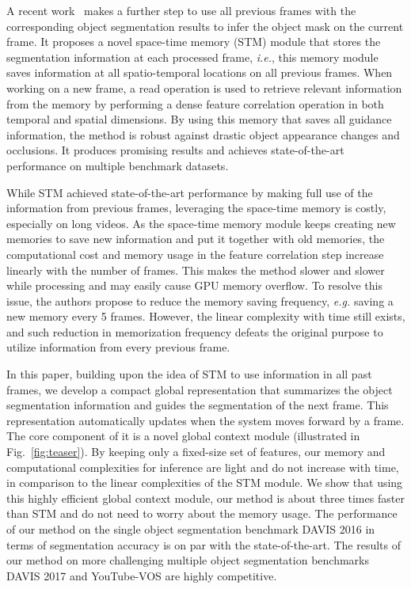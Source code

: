 \documentclass[runningheads]{llncs}
\begin{document}
A recent work~\cite{stm} makes a further step to use all previous frames with the corresponding object segmentation results to infer the object mask on the current frame. It proposes a novel space-time memory (STM) module that stores the segmentation information at each processed frame, \textit{i.e.}, this memory module saves information at all spatio-temporal locations on all previous frames. When working on a new frame, a read operation is used to retrieve relevant information from the memory by performing a dense feature correlation operation in both temporal and spatial dimensions. By using this memory that saves all guidance information, the method is robust against drastic object appearance changes and occlusions. It produces promising results and achieves state-of-the-art performance on multiple benchmark datasets.

While STM achieved state-of-the-art performance by making full use of the information from previous frames, leveraging the space-time memory is costly, especially on long videos. As the space-time memory module keeps creating new memories to save new information and put it together with old memories, the computational cost and memory usage in the feature correlation step increase linearly with the number of frames. This makes the method slower and slower while processing and may easily cause GPU memory overflow. To resolve this issue, the authors propose to reduce the memory saving frequency, \textit{e.g.} saving a new memory every 5 frames. However, the linear complexity with time still exists, and such reduction in memorization frequency defeats the original purpose to utilize information from every previous frame.

In this paper, building upon the idea of STM to use information in all past frames, we develop a compact global representation that summarizes the object segmentation information and guides the segmentation of the next frame. This representation automatically updates when the system moves forward by a frame. The core component of it is a novel global context module (illustrated in Fig.~\ref{fig:teaser}). By keeping only a fixed-size set of features, our memory and computational complexities for inference are light and do not increase with time, in comparison to the linear complexities of the STM module. We show that using this highly efficient global context module, our method is about three times faster than STM and do not need to worry about the memory usage. The performance of our method on the single object segmentation benchmark DAVIS 2016 in terms of segmentation accuracy is on par with the state-of-the-art. The results of our method on more challenging multiple object segmentation benchmarks DAVIS 2017 and YouTube-VOS are highly competitive.
\end{document}
